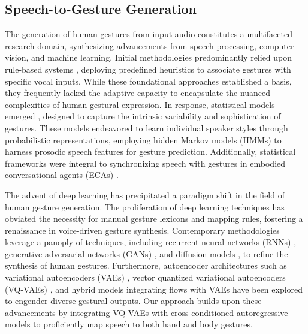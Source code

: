 \subsection{Speech-to-Gesture Generation}
The generation of human gestures from input audio constitutes a multifaceted research domain, synthesizing advancements from speech processing, computer vision, and machine learning. Initial methodologies predominantly relied upon rule-based systems \cite{22}, deploying predefined heuristics to associate gestures with specific vocal inputs. While these foundational approaches established a basis, they frequently lacked the adaptive capacity to encapsulate the nuanced complexities of human gestural expression. In response, statistical models emerged \cite{23}, designed to capture the intrinsic variability and sophistication of gestures. These models \cite{24} endeavored to learn individual speaker styles through probabilistic representations, employing hidden Markov models (HMMs) \cite{25} to harness prosodic speech features for gesture prediction. Additionally, statistical frameworks were integral to synchronizing speech with gestures in embodied conversational agents (ECAs) \cite{26}.

The advent of deep learning has precipitated a paradigm shift in the field of human gesture generation. The proliferation of deep learning techniques has obviated the necessity for manual gesture lexicons and mapping rules, fostering a renaissance in voice-driven gesture synthesis. Contemporary methodologies leverage a panoply of techniques, including recurrent neural networks (RNNs) \cite{27,28,29}, generative adversarial networks (GANs) \cite{30,31,32}, and diffusion models \cite{12,33,34,35}, to refine the synthesis of human gestures. Furthermore, autoencoder architectures such as variational autoencoders (VAEs) \cite{10,36,37,38}, vector quantized variational autoencoders (VQ-VAEs) \cite{11,39,40}, and hybrid models integrating flows with VAEs \cite{41} have been explored to engender diverse gestural outputs. Our approach builds upon these advancements by integrating VQ-VAEs with cross-conditioned autoregressive models to proficiently map speech to both hand and body gestures.

